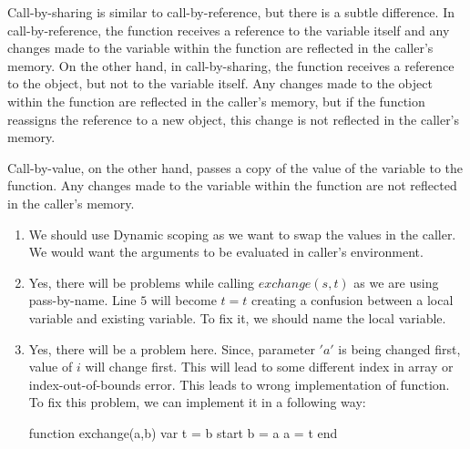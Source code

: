 \documentclass[letterpaper,11pt]{article}
\newcounter{problemid}
\def\newproblem{\clearpage\newpage{\bf Problem~\arabic{problemid}\stepcounter{problemid}}\hfill\par}
\begin{document}
Call-by-sharing is similar to call-by-reference, but there is a subtle difference. In call-by-reference, the function receives a reference to the variable itself and any changes made to the variable within the function are reflected in the caller's memory. On the other hand, in call-by-sharing, the function receives a reference to the object, but not to the variable itself. Any changes made to the object within the function are reflected in the caller's memory, but if the function reassigns the reference to a new object, this change is not reflected in the caller's memory.

Call-by-value, on the other hand, passes a copy of the value of the variable to the function. Any changes made to the variable within the function are not reflected in the caller's memory.


\newproblem

\begin{enumerate}
    
    \item We should use Dynamic scoping as we want to swap the values in the caller. We would want the arguments to be evaluated in caller's environment.
    
    \item Yes, there will be problems while calling $exchange(s,t)$ as we are using pass-by-name. Line $5$ will become $t=t$ creating a confusion between a local variable and existing variable. To fix it, we should name the local variable.
    
    \item Yes, there will be a problem here. Since, parameter $'a'$ is being changed first, value of $i$ will change first. This will lead to some different index in array or index-out-of-bounds error. This leads to wrong implementation of function. To fix this problem, we can implement it in a following way: 
    
    function exchange(a,b)
    \tabto{20pt} var t = b
    \tabto{20pt} start
    \tabto{40pt} b = a
    \tabto{20pt} a = t
    \tabto{20pt} end
\end{enumerate}
\end{document}
